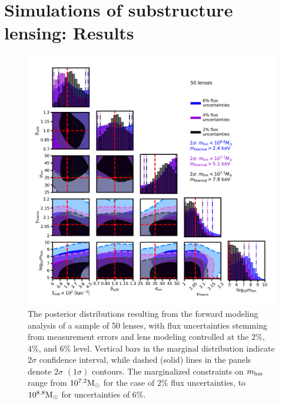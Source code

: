 \section{Simulations of substructure lensing: Results}
\label{sec:results}
\begin{figure}
	\includegraphics[clip,trim=0cm 0cm 0cm
	0cm,width=.9\textwidth,keepaspectratio]{./figures_LOSforward/CDM_full.pdf}
	\caption[Joint posterior distribution for all model parameters from 50 mock lenses]{\label{fig:CDM_1} The posterior distributions resulting from the forward modeling analysis of a sample of 50 lenses, with flux uncertainties stemming from measurement errors and lens modeling controlled at the $2\%$, $4\%$, and $6\%$ level. Vertical bars in the marginal distribution indicate $2 \sigma$ confidence interval, while dashed (solid) lines in the panels denote $2 \sigma$ $\left(1 \sigma\right)$ contours. The marginalized constraints on ${m_{\rm{hm}}}$ range from $10^{7.2} {\rm{M}_{\odot}}$ for the case of $2 \%$ flux uncertainties, to $10^{8.8} {\rm{M}_{\odot}}$ for uncertainties of $6 \%$.}
\end{figure}	
